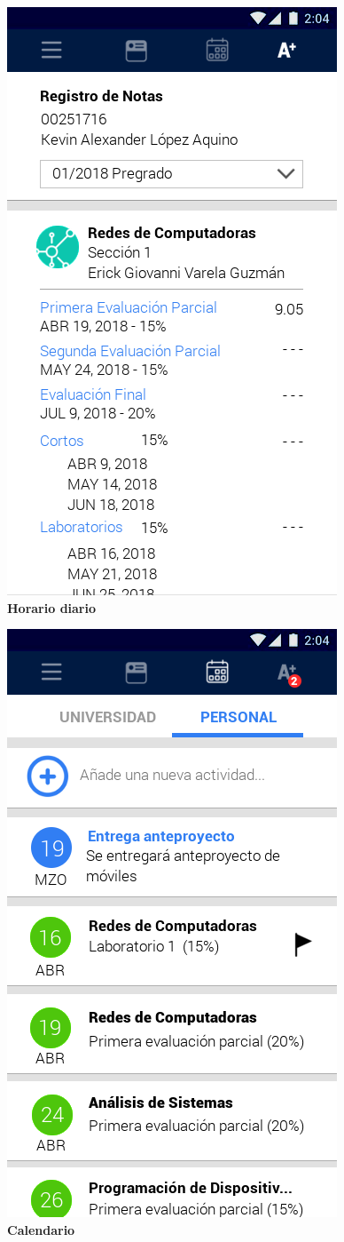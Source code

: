 \documentclass[12pt]{article}
\begin{document}
\begin{figure}[H]
	\caption{\textbf{Horario diario}}
	\label{fig:consultaNotas}
	\includegraphics[scale=0.50]{img/6.png}
	\centering
\end{figure}

\begin{figure}[H]
	\caption{\textbf{Calendario}}
	\label{fig:calendario}
	\includegraphics[scale=0.50]{img/4.png}
	\centering
\end{figure}
\end{document}
